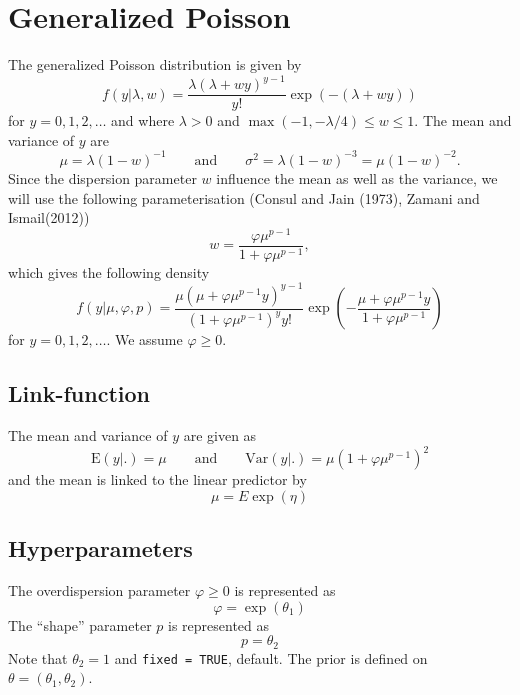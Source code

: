 \documentclass[a4paper,11pt]{article}
\begin{document}
\section*{Generalized Poisson}

The generalized Poisson distribution is given by
\begin{displaymath}
    f(y|\lambda,w) = \frac{\lambda(\lambda+wy)^{y-1}}{y!}
    \exp(-(\lambda+wy))
\end{displaymath}
for $y=0, 1, 2, \ldots$ and where $\lambda>0$ and
$\max(-1,-\lambda/4)\leq w\leq 1$. The mean and variance of $y$ are
\begin{displaymath}
    \mu =\lambda(1-w)^{-1} \qquad\text{and}\qquad
    \sigma^{2} = \lambda(1-w)^{-3}= \mu(1-w)^{-2}.
\end{displaymath}
Since the dispersion parameter $w$ influence the mean as well as the
variance, we will use the following parameterisation (Consul and Jain
(1973), Zamani and Ismail(2012))
\begin{displaymath}
    w=\frac{\varphi\mu^{p-1}}{1+\varphi\mu^{p-1}}, 
\end{displaymath}
which gives the following density
\begin{displaymath} 
    f(y|\mu,\varphi,p) =\frac{ \mu(\mu+\varphi\mu^{p-1} y)^{y-1}}%
    {(1+\varphi\mu^{p-1})^{y}y!}
    \exp\left(-\frac{\mu+\varphi\mu^{p-1} y}{1+\varphi\mu^{p-1}}\right)
\end{displaymath}
for $y=0, 1, 2, \ldots$. We assume $\varphi \ge 0$.

\subsection*{Link-function}

The mean and variance of $y$ are given as
\begin{displaymath}
    \text{E}(y|.) = \mu \qquad\text{and}\qquad
    \text{Var}(y|.) = \mu\left(1+\varphi\mu^{p-1}\right)^{2}
\end{displaymath}
and the mean is linked to the linear predictor by
\begin{displaymath}
    \mu = E \exp(\eta)
\end{displaymath}

\subsection*{Hyperparameters}

The overdispersion parameter $\varphi \ge 0$ is represented as
\begin{displaymath}
    \varphi = \exp(\theta_{1}) 
\end{displaymath}
The ``shape'' parameter $p$ is represented as
\begin{displaymath}
    p = \theta_{2}
\end{displaymath}
Note that $\theta_{2}=1$ and \texttt{fixed = TRUE}, default. The
prior is defined on ${\theta}=(\theta_1,\theta_2)$.
\end{document}
